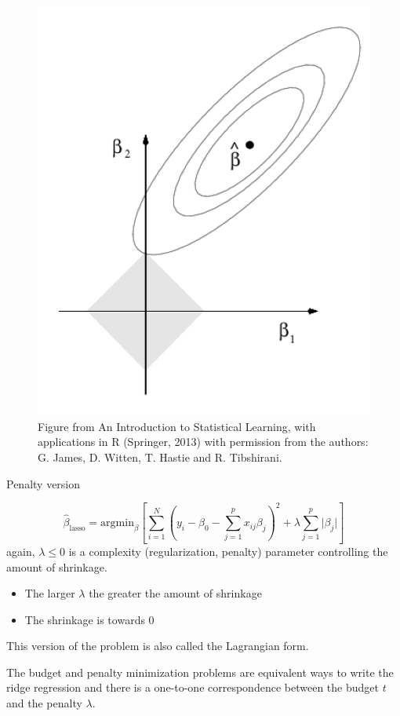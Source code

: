 \documentclass[
  ignorenonframetext,
]{beamer}
\providecommand{\tightlist}{%
  \setlength{\itemsep}{0pt}\setlength{\parskip}{0pt}}
\begin{document}
\begin{frame}

\begin{figure}
\includegraphics[width=0.5\linewidth]{./ILS67lasso} \caption{Figure from An Introduction to Statistical Learning, with applications in R (Springer, 2013) with permission from the authors: G. James, D. Witten, T. Hastie and R. Tibshirani.}\label{fig:unnamed-chunk-11}
\end{figure}

\end{frame}

\begin{frame}

\begin{block}{Penalty version}

\[ \hat{\beta}_{\text{lasso}}= \text{argmin}_{\beta} [\sum_{i=1}^N (y_i-\beta_0-\sum_{j=1}^p x_{ij}\beta_j )^2 + \lambda \sum_{j=1}^p \lvert \beta_j\rvert ] \]
again, \(\lambda \le 0\) is a complexity (regularization, penalty)
parameter controlling the amount of shrinkage.

\begin{itemize}
\tightlist
\item
  The larger \(\lambda\) the greater the amount of shrinkage
\item
  The shrinkage is towards 0
\end{itemize}

This version of the problem is also called the Lagrangian form.

The budget and penalty minimization problems are equivalent ways to
write the ridge regression and there is a one-to-one correspondence
between the budget \(t\) and the penalty \(\lambda\).

\end{block}

\end{frame}
\end{document}
